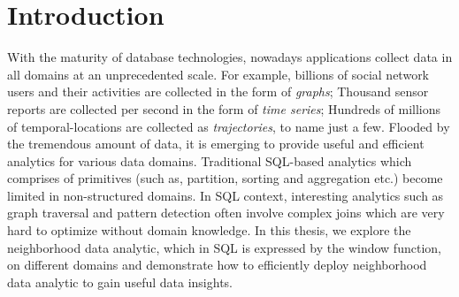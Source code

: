 \chapter{Introduction}
With the maturity of database technologies, nowadays
applications collect data in all domains at an
unprecedented scale. For example, billions of 
social network users and their activities are collected in the form
of \emph{graphs}; Thousand sensor reports are collected per second
in the form of \emph{time series}; Hundreds of millions of temporal-locations
are collected as \emph{trajectories}, to name just a few. Flooded by the
tremendous amount of data, it is emerging to 
provide useful and efficient analytics for various data domains.
Traditional SQL-based analytics which comprises 
of primitives (such as, partition, sorting and aggregation etc.)
become limited in non-structured domains.
In SQL context, interesting analytics such as graph traversal and pattern detection
often involve complex joins which are very hard to optimize 
without domain knowledge.
In this thesis, we explore the neighborhood data analytic, which
in SQL is expressed by the window function,
on different domains and demonstrate how to efficiently deploy
neighborhood data analytic to gain useful data insights.
%
%

